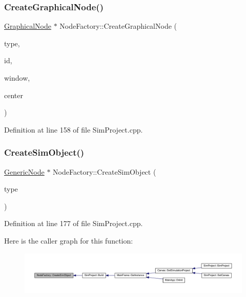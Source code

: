\subsubsection{\texorpdfstring{Create\+Graphical\+Node()}{CreateGraphicalNode()}\hspace{0.1cm}{\footnotesize\ttfamily [2/2]}}
{\footnotesize\ttfamily \hyperlink{class_graphical_node}{Graphical\+Node} $\ast$ Node\+Factory\+::\+Create\+Graphical\+Node (\begin{DoxyParamCaption}\item[{\hyperlink{class_generic_node_a9e7985ab9bbfa1c85091adc0ab71a6b6}{Generic\+Node\+::\+Type}}]{type,  }\item[{\hyperlink{_graphical_element_8h_ade5fd6c85839a416577ff9de1605141e}{Element\+Key}}]{id,  }\item[{wx\+Window $\ast$}]{window,  }\item[{wx\+Point2\+D\+Double}]{center }\end{DoxyParamCaption})\hspace{0.3cm}{\ttfamily [static]}}



Definition at line 158 of file Sim\+Project.\+cpp.

\mbox{\label{class_node_factory_a95b5ced21c265b1d028e98499945c341}} 
\subsubsection{\texorpdfstring{Create\+Sim\+Object()}{CreateSimObject()}}
{\footnotesize\ttfamily \hyperlink{class_generic_node}{Generic\+Node} $\ast$ Node\+Factory\+::\+Create\+Sim\+Object (\begin{DoxyParamCaption}\item[{\hyperlink{class_generic_node_a9e7985ab9bbfa1c85091adc0ab71a6b6}{Generic\+Node\+::\+Type}}]{type }\end{DoxyParamCaption})\hspace{0.3cm}{\ttfamily [static]}}



Definition at line 177 of file Sim\+Project.\+cpp.

Here is the caller graph for this function\+:
\nopagebreak
\begin{figure}[H]
\begin{center}
\leavevmode
\includegraphics[width=350pt]{class_node_factory_a95b5ced21c265b1d028e98499945c341_icgraph}
\end{center}
\end{figure}


